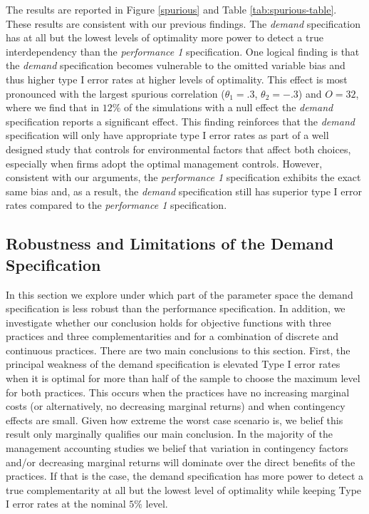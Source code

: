 \documentclass[12pt]{article}
\begin{document}
The results are reported in Figure \ref{spurious} and Table \ref{tab:spurious-table}. These results are consistent with our previous findings. The \emph{demand} specification has at all but the lowest levels of optimality more power to detect a true interdependency than the \emph{performance 1} specification. One logical finding is that the \emph{demand} specification becomes vulnerable to the omitted variable bias and thus higher type I error rates at higher levels of optimality. This effect is most pronounced with the largest spurious correlation (\(\theta_1 = .3\), \(\theta_2 = -.3\)) and \(O = 32\), where we find that in $12\%$ of the simulations with a null effect the \emph{demand} specification reports a significant effect. This finding reinforces that the \emph{demand} specification will only have appropriate type I error rates as part of a well designed study that controls for environmental factors that affect both choices, especially when firms adopt the optimal management controls. However, consistent with our arguments, the \emph{performance 1} specification exhibits the exact same bias and, as a result, the \emph{demand} specification still has superior type I error rates compared to the \emph{performance 1} specification.

\subsection{Robustness and Limitations of the Demand Specification} \label{robustness-demand}

In this section we explore under which part of the parameter space the demand specification is less robust than the performance specification. In addition, we investigate whether our conclusion holds for objective functions with three practices and three complementarities and for a combination of discrete and continuous practices. There are two main conclusions to this section. First, the principal weakness of the demand specification is elevated Type I error rates when it is optimal for more than half of the sample to choose the maximum level for both practices. This occurs when the practices have no increasing marginal costs (or alternatively, no decreasing marginal returns) and when contingency effects are small. Given how extreme the worst case scenario is, we belief this result only marginally qualifies our main conclusion. In the majority of the management accounting studies we belief that variation in contingency factors and/or decreasing marginal returns will dominate over the direct benefits of the practices. If that is the case, the demand specification has more power to detect a true complementarity at all but the lowest level of optimality while keeping Type I error rates at the nominal $5\%$ level.
\end{document}
